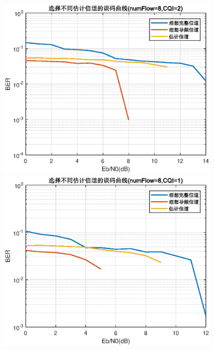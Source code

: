 \documentclass{article}
\begin{document}
\begin{figure}[htbp]
	\centering
	\begin{minipage}[t]{0.48\textwidth}
	\centering
	\includegraphics[width=\textwidth]{plot/plot_CQI2.eps}
	\end{minipage}
	\begin{minipage}[t]{0.48\textwidth}
	\centering
	\includegraphics[width=\textwidth]{plot/plot_CQI1.eps}
	\end{minipage}
\end{figure}
\end{document}
